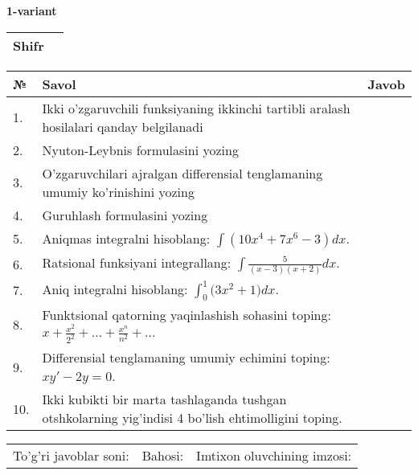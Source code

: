 \documentclass{article}
\begin{document}


  \textbf{1-variant}\\
  
  \bgroup
  \def\arraystretch{1.6} %
  
  \begin{tabular}{|m{5.7cm}|m{9.5cm}|}
  \hline
  Shifr & \\
  \hline
  \end{tabular}
  
  \vspace{1cm}
  
  \begin{tabular}{|m{0.7cm}|m{10cm}|m{4cm}|}
  \hline
  № & Savol & Javob \\
  \hline
  1. & Ikki o'zgaruvchili funksiyaning ikkinchi tartibli aralash hosilalari qanday belgilanadi &  \\
  \hline
  2. & Nyuton-Leybnis formulasini yozing &  \\
  \hline
  3. & O'zgaruvchilari ajralgan differensial tenglamaning umumiy ko'rinishini yozing &  \\
  \hline
  4. & Guruhlash formulasini yozing &  \\
  \hline
  5. & Aniqmas integralni hisoblang: \(\int {\left( 10x^{4} + 7x^{6} - 3 \right)dx}\). &  \\
  \hline
  6. & Ratsional funksiyani integrallang: \(\int {\frac{5}{(x - 3)(x + 2)}dx}\). &  \\
  \hline
  7. & Aniq integralni hisoblang: \(\int_{0}^{1}{(3x^{2}} + 1)dx\). &  \\
  \hline
  8. & Funktsional qatorning yaqinlashish sohasini toping: \(x + \frac{x^{2}}{2^{2}} + ... + \frac{x^{n}}{n^{2}} + ...\) &  \\
  \hline
  9. & Differensial tenglamaning umumiy echimini toping: \(xy' - 2y = 0\). &  \\
  \hline
  10. & Ikki kubikti bir marta tashlaganda tushgan otshkolarning yig'indisi 4 bo'lish ehtimolligini toping. &  \\
  \hline
  \end{tabular}
  
  \vspace{1cm}
  
  \begin{tabular}{lll}
  To'g'ri javoblar soni: \underline{\hspace{1.5cm}} & 
  Bahosi: \underline{\hspace{1.5cm}} & 
  Imtixon oluvchining imzosi: \underline{\hspace{2cm}} \\
  \end{tabular}
  
\end{document}
